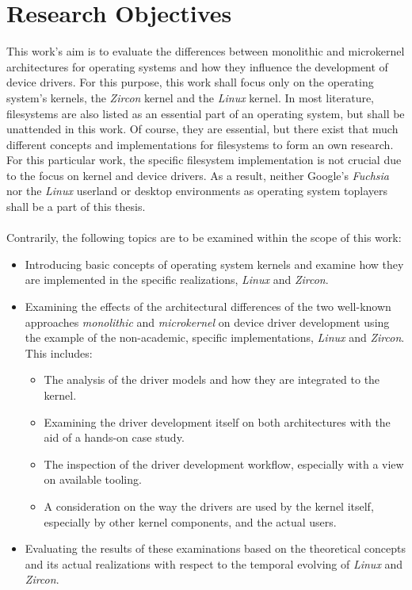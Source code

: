 \section{Research Objectives}\label{sec:research-objectives}
This work's aim is to evaluate the differences between monolithic and microkernel architectures for operating systems and how they influence the development of device drivers.
For this purpose, this work shall focus only on the operating system's kernels, the \textit{Zircon} kernel and the \textit{Linux} kernel.
In most literature, filesystems are also listed as an essential part of an operating system, but shall be unattended in this work.
Of course, they are essential, but there exist that much different concepts and implementations for filesystems to form an own research.
For this particular work, the specific filesystem implementation is not crucial due to the focus on kernel and device drivers.
As a result, neither Google's \textit{Fuchsia} nor the \textit{Linux} userland or desktop environments as operating system toplayers shall be a part of this thesis.\\
\\
Contrarily, the following topics are to be examined within the scope of this work:
\begin{itemize}
    \item Introducing basic concepts of operating system kernels and examine how they are implemented in the specific realizations, \textit{Linux} and \textit{Zircon}.
    \item Examining the effects of the architectural differences of the two well-known approaches \textit{monolithic} and \textit{microkernel} on device driver development using the example of the non-academic, specific implementations, \textit{Linux} and \textit{Zircon}. This includes:  
        \begin{itemize}
            \item The analysis of the driver models and how they are integrated to the kernel.
            \item Examining the driver development itself on both architectures with the aid of a hands-on case study.
            \item The inspection of the driver development workflow, especially with a view on available tooling. 
            \item A consideration on the way the drivers are used by the kernel itself, especially by other kernel components, and the actual users.
        \end{itemize}
    \item Evaluating the results of these examinations based on the theoretical concepts and its actual realizations with respect to the temporal evolving of \textit{Linux} and \textit{Zircon}.
\end{itemize}

